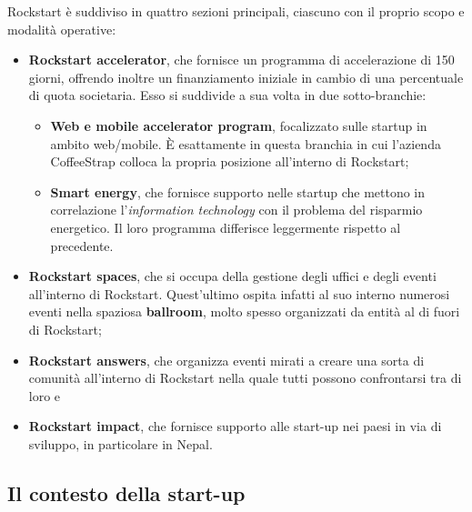 Rockstart è suddiviso in quattro sezioni principali, ciascuno con il proprio scopo e modalità operative:

\begin{itemize}

\item \textbf{Rockstart accelerator}, che fornisce un programma di accelerazione di 150 giorni, offrendo inoltre un finanziamento iniziale in cambio di una percentuale di quota societaria. Esso si suddivide a sua volta in due sotto-branchie:

\begin{itemize}

\item \textbf{Web e mobile accelerator program}, focalizzato sulle startup in ambito web/mobile. È esattamente in questa branchia in cui l'azienda CoffeeStrap colloca la propria posizione all'interno di Rockstart;

\item \textbf{Smart energy}, che fornisce supporto nelle startup che mettono in correlazione l'\textit{information technology} con il problema del risparmio energetico. Il loro programma differisce leggermente rispetto al precedente.

\end{itemize}

\item \textbf{Rockstart spaces}, che si occupa della gestione degli uffici e degli eventi all'interno di Rockstart. Quest'ultimo ospita infatti al suo interno numerosi eventi nella spaziosa \textbf{ballroom}, molto spesso organizzati da entità al di fuori di Rockstart;

\item \textbf{Rockstart answers}, che organizza eventi mirati a creare una sorta di comunità all'interno di Rockstart nella quale tutti possono confrontarsi tra di loro e

\item \textbf{Rockstart impact}, che fornisce supporto alle start-up nei paesi in via di sviluppo, in particolare in Nepal. 

\end{itemize}

\subsection{Il contesto della start-up}

